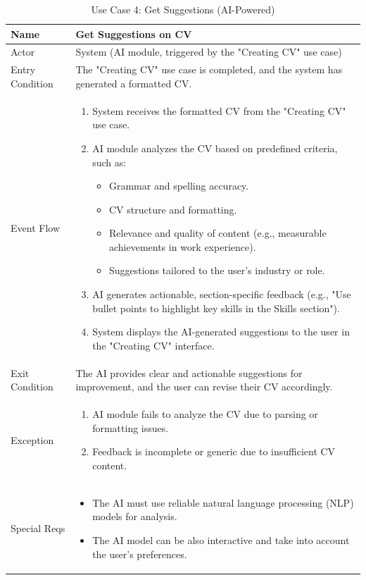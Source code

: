 \begin{table}[H]
\centering
\begin{tabular}{|l|p{12cm}|}
\hline
Name             & Get Suggestions on CV \\ \hline
Actor            & System (AI module, triggered by the "Creating CV" use case) \\ \hline
Entry Condition  & 
The "Creating CV" use case is completed, and the system has generated a formatted CV. \\ \hline
Event Flow       & 
\begin{enumerate}
    \item System receives the formatted CV from the "Creating CV" use case.
    \item AI module analyzes the CV based on predefined criteria, such as:
    \begin{itemize}
        \item Grammar and spelling accuracy.
        \item CV structure and formatting.
        \item Relevance and quality of content (e.g., measurable achievements in work experience).
        \item Suggestions tailored to the user's industry or role.
    \end{itemize}
    \item AI generates actionable, section-specific feedback (e.g., "Use bullet points to highlight key skills in the Skills section").
    \item System displays the AI-generated suggestions to the user in the "Creating CV" interface.
\end{enumerate} \\ \hline
Exit Condition   & 
The AI provides clear and actionable suggestions for improvement, and the user can revise their CV accordingly. \\ \hline
Exception        & 
\begin{enumerate}
    \item AI module fails to analyze the CV due to parsing or formatting issues.
    \item Feedback is incomplete or generic due to insufficient CV content.
\end{enumerate} \\ \hline
Special Reqs     & 
\begin{itemize}
    \item The AI must use reliable natural language processing (NLP) models for analysis.
    \item The AI model can be also interactive and take into account the user's preferences.
\end{itemize} \\ \hline
\end{tabular}
\caption{Use Case 4: Get Suggestions (AI-Powered)}
\label{tab:get_suggestions}
\end{table}

